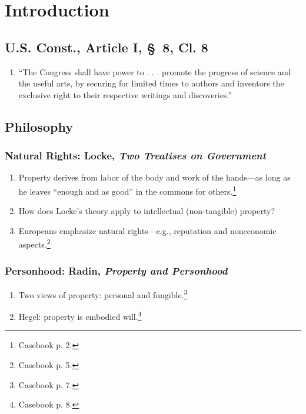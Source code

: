\section{Introduction}

\subsection{U.S. Const., Article I, \S\ 8, Cl. 8}

\begin{enumerate}
    \item ``The Congress shall have power to . . . promote the progress of 
    science and the useful arts, by securing for limited times to authors and 
    inventors the exclusive right to their respective writings and 
    discoveries.''
\end{enumerate}

\subsection{Philosophy}

\subsubsection{Natural Rights: Locke, \emph{Two Treatises on Government}}

\begin{enumerate}
    \item Property derives from labor of the body and work of the 
    hands---as long as he leaves ``enough and as good'' in the commons for 
    others.\footnote{Casebook p. 2.}
    \item How does Locke's theory apply to intellectual (non-tangible) 
    property?
    \item Europeans emphasize natural rights---e.g., reputation and 
    noneconomic aspects.\footnote{Casebook p. 5.}
\end{enumerate}

\subsubsection{Personhood: Radin, \emph{Property and Personhood}}

\begin{enumerate}
    \item Two views of property: personal and fungible.\footnote{Casebook p. 
    7.}
    \item Hegel: property is embodied will.\footnote{Casebook p. 8.}
\end{enumerate}

